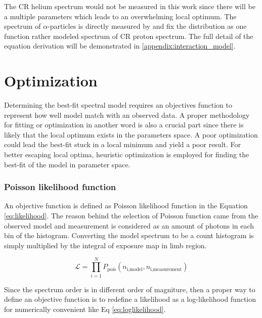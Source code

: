 The CR helium spectrum would not be measured in this work 
since there will be a multiple parameters which leads to an overwhelming 
local optimum. The spectrum of $\alpha$-particles is directly measured 
by \cite{AMS-02Helium} and fix the distribution as one function rather 
modeled spectrum of CR proton spectrum. The full detail of the 
equation derivation will be demonstrated in \ref{appendix:interaction_model}.



\section{Optimization}
Determining the best-fit spectral model requires an objectives function
to represent how well model match with an observed data. A proper 
methodology for fitting or optimization in another word is also 
a crucial part since there is likely that the local optimum exists 
in the parameters space. A poor optimization could lead the best-fit
stuck in a local minimum and yield a poor result. For better escaping 
local optima, heuristic optimization is employed for finding the 
best-fit of the model in parameter space.


\subsubsection{Poisson likelihood function}
An objective function is defined as Poisson likelihood function 
in the Equation \ref{eq:likelihood}. The reason behind the selection 
of Poisson function came from the observed model and measurement is 
considered as an amount of photons in each bin of the histogram. 
Converting the model spectrum to be a count histogram is simply 
multiplied by the integral of exposure map in limb region.

\begin{equation}
    \mathcal{L} = \prod_{i=1}^{N} P_{\text{pois}}(n_{\text{i,model}}, n_{\text{i,measurement}})
    \label{eq:likelihood}
\end{equation}

Since the spectrum order is in different order of magniture, then a
proper way to define an objective function is to redefine a
likelihood as a log-likelihood function for numerically
convenient like Eq \ref{eq:loglikelihood}. 

